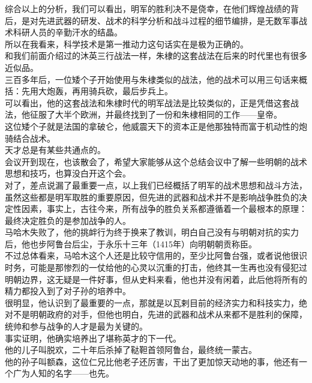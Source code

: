 \begin{multicols}{\theparacolNo}
综合以上的分析，我们可以看出，明军的胜利决不是侥幸，在他们辉煌战绩的背后，是对先进武器的研发、战术的科学分析和战斗过程的细节编排，是无数军事战术科研人员的辛勤汗水的结晶。\\

所以在我看来，科学技术是第一推动力这句话实在是极为正确的。\\

和我们前面介绍过的沐英三行战法一样，朱棣的这套战法在后来的时代里也有很多近似品。\\

三百多年后，一位矮个子开始使用与朱棣类似的战法，他的战术可以用三句话来概括：先用大炮轰，再用骑兵砍，最后步兵上。\\

可以看出，他的这套战法和朱棣时代的明军战法是比较类似的，正是凭借这套战法，他征服了大半个欧洲，并最终找到了一份和朱棣相同的工作——皇帝。\\

这位矮个子就是法国的拿破仑，他威震天下的资本正是他那独特而富于机动性的炮骑结合战术。\\

天才总是有某些共通点的。\\

会议开到现在，也该散会了，希望大家能够从这个总结会议中了解一些明朝的战术思想和技巧，也算没白开这个会。\\

对了，差点说漏了最重要一点，以上我们已经概括了明军的战术思想和战斗方法，虽然这些都是明军取胜的重要原因，但先进的武器和战术并不是影响战争胜负的决定性因素，事实上，古往今来，所有战争的胜负关系都遵循着一个最根本的原理：\\

最终决定胜负的是参加战争的人。\\

马哈木失败了，他的挑衅行为终于换来了教训，明白自己没有与明朝对抗的实力后，他也步阿鲁台后尘，于永乐十三年（1415年）向明朝朝贡称臣。\\

不过总体看来，马哈木这个人还是比较守信用的，至少比阿鲁台强，或者说他很识时务，可能是那惨烈的一仗给他的心灵以沉重的打击，他终其一生再也没有侵犯过明朝边界，这无疑是一件好事，但从史料来看，他也并没有闲着，此后他将所有的精力都投入到了对子孙的培养中。\\

很明显，他认识到了最重要的一点，那就是以瓦剌目前的经济实力和科技实力，绝对不是明朝政府的对手，但他也明白，先进的武器和战术从来都不是胜利的保障，统帅和参与战争的人才是最为关键的。\\

事实证明，他确实培养出了堪称英才的下一代。\\

他的儿子叫脱欢，二十年后杀掉了鞑靼首领阿鲁台，最终统一蒙古。\\

他的孙子叫额森，这位仁兄比他老子还厉害，干出了更加惊天动地的事，他还有一个广为人知的名字——也先。\\
\ifnum{}
	\end{multicols}
\fi
\newpage
